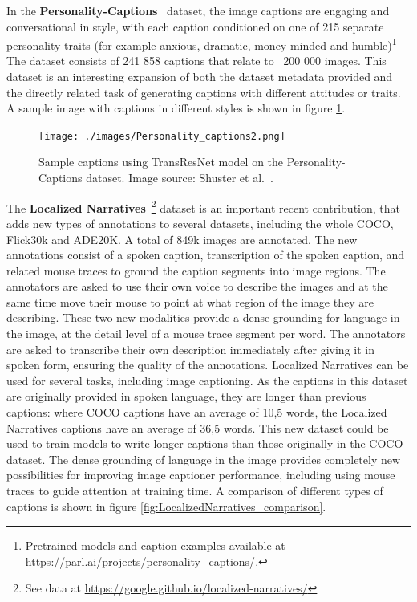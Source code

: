 \documentclass[english,twoside,openright]{HYgraduMLDS}
\begin{document}
In the \textbf{Personality-Captions}~\cite{PersonalityCaptions} dataset, the image captions are engaging and conversational in style, with each caption conditioned on one of 215 separate personality traits (for example anxious, dramatic, money-minded and humble)\footnote{Pretrained models and caption examples available at \url{https://parl.ai/projects/personality_captions/}.} The dataset consists of 241 858 captions that relate to ~200 000 images. This dataset is an interesting expansion of both the dataset metadata provided and the directly related task of generating captions with different attitudes or traits. A sample image with captions in different styles is shown in figure \ref{fig:personality_captions}.

\begin{figure}[h] 
\centering
\texttt{[image: ./images/Personality\_captions2.png]}
\caption{Sample captions using TransResNet model on the Personality-Captions dataset. Image source: Shuster et al.~\cite{PersonalityCaptions}.}
\label{fig:personality_captions}
\end{figure}

The \textbf{Localized Narratives}~\cite{LocalizedNarratives}\footnote{See data at \url{https://google.github.io/localized-narratives/}} dataset is an important recent contribution, that adds new types of annotations to several datasets, including the whole COCO, Flick30k and ADE20K. A total of 849k images are annotated. The new annotations consist of a spoken caption, transcription of the spoken caption, and related mouse traces to ground the caption segments into image regions. The annotators are asked to use their own voice to describe the images and at the same time move their mouse to point at what region of the image they are describing. These two new modalities provide a dense grounding for language in the image, at the detail level of a mouse trace segment per word. The annotators are asked to transcribe their own description immediately after giving it in spoken form, ensuring the quality of the annotations. Localized Narratives can be used for several tasks, including image captioning. As the captions in this dataset are originally provided in spoken language, they are longer than previous captions: where COCO captions have an average of 10,5 words, the Localized Narratives captions have an average of 36,5 words. This new dataset could be used to train models to write longer captions than those originally in the COCO dataset. The dense grounding of language in the image provides completely new possibilities for improving image captioner performance, including using mouse traces to guide attention at training time. A comparison of different types of captions is shown in figure \ref{fig:LocalizedNarratives_comparison}.
\end{document}
